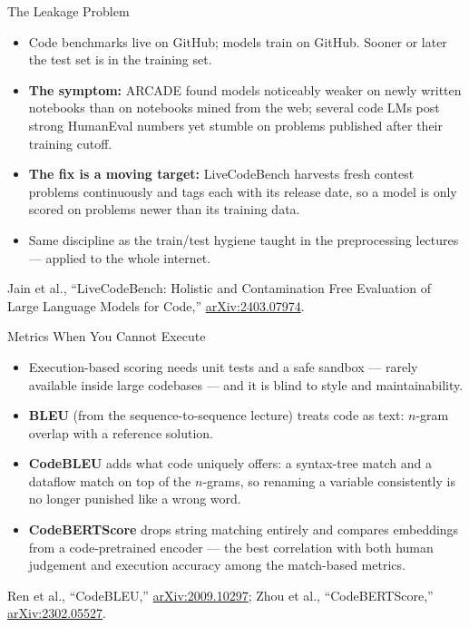 \begin{frame}{The Leakage Problem}
  \begin{itemize}\itemsep0.5em
    \item[\textcolor{red}{$\triangleright$}] Code benchmarks live on GitHub; models train on GitHub. Sooner
      or later the test set is in the training set.
    \item[\textcolor{red}{$\triangleright$}] \textbf{The symptom:} ARCADE found models noticeably weaker on
      newly written notebooks than on notebooks mined from the web; several code LMs post strong HumanEval
      numbers yet stumble on problems published after their training cutoff.
    \item[\textcolor{red}{$\triangleright$}] \textbf{The fix is a moving target:} LiveCodeBench harvests
      fresh contest problems continuously and tags each with its release date, so a model is only scored on
      problems newer than its training data.
    \item[\textcolor{red}{$\triangleright$}] Same discipline as the train/test hygiene taught in the
      preprocessing lectures --- applied to the whole internet.
  \end{itemize}
  \vspace{0.3em}
  {\scriptsize Jain et al., ``LiveCodeBench: Holistic and Contamination Free Evaluation of Large Language
  Models for Code,'' \href{https://arxiv.org/abs/2403.07974}{arXiv:2403.07974}.}
\end{frame}

\begin{frame}{Metrics When You Cannot Execute}
  \begin{itemize}\itemsep0.4em
    \item[\textcolor{red}{$\triangleright$}] Execution-based scoring needs unit tests and a safe sandbox ---
      rarely available inside large codebases --- and it is blind to style and maintainability.
    \item[\textcolor{red}{$\triangleright$}] \textbf{BLEU} (from the sequence-to-sequence lecture) treats
      code as text: $n$-gram overlap with a reference solution.
    \item[\textcolor{red}{$\triangleright$}] \textbf{CodeBLEU} adds what code uniquely offers: a syntax-tree
      match and a dataflow match on top of the $n$-grams, so renaming a variable consistently is no longer
      punished like a wrong word.
    \item[\textcolor{red}{$\triangleright$}] \textbf{CodeBERTScore} drops string matching entirely and
      compares embeddings from a code-pretrained encoder --- the best correlation with both human judgement
      and execution accuracy among the match-based metrics.
  \end{itemize}
  \vspace{0.3em}
  {\scriptsize Ren et al., ``CodeBLEU,'' \href{https://arxiv.org/abs/2009.10297}{arXiv:2009.10297}; Zhou et
  al., ``CodeBERTScore,'' \href{https://arxiv.org/abs/2302.05527}{arXiv:2302.05527}.}
\end{frame}

